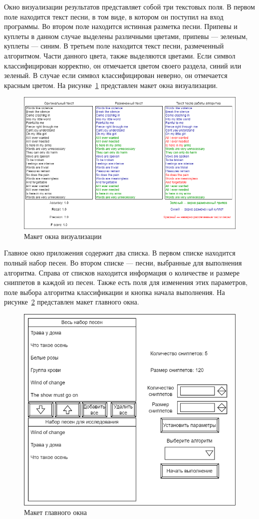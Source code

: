 Окно визуализации результатов представляет собой три текстовых поля. В первом поле находится текст песни, в том виде, в котором он поступил на вход программы. Во втором поле находится истинная разметка песни. Припевы и куплеты в данном случае выделены различными цветами, припевы — зеленым, куплеты — синим. В третьем поле находится текст песни, размеченный алгоритмом. Части данного цвета, также выделяются цветами. Если символ классифицирован корректно, он отмечается цветом своего раздела, синий или зеленый. В случае если символ классифицирован неверно, он отмечается красным цветом. На рисунке~\ref{fig:Визуализация} представлен макет окна визуализации.

\begin{figure}
    \centering
    \includegraphics[width=1\linewidth]{pictures/Визуализация.png}
    \caption{Макет окна визуализации}
    \label{fig:Визуализация}
\end{figure}

Главное окно приложения содержит два списка. В первом списке находится полный набор песен. Во втором списке — песни, выбранные для выполнения алгоритма. Справа от списков находится информация о количестве и размере сниппетов в каждой из песен. Также есть поля для изменения этих параметров, поле выбора алгоритма классификации и кнопка начала выполнения. На рисунке~\ref{fig:Главное окно} представлен макет главного окна.

\begin{figure}
    \centering
    \includegraphics[width=1\linewidth]{pictures/Главное окно.png}
    \caption{Макет главного окна}
    \label{fig:Главное окно}
\end{figure}